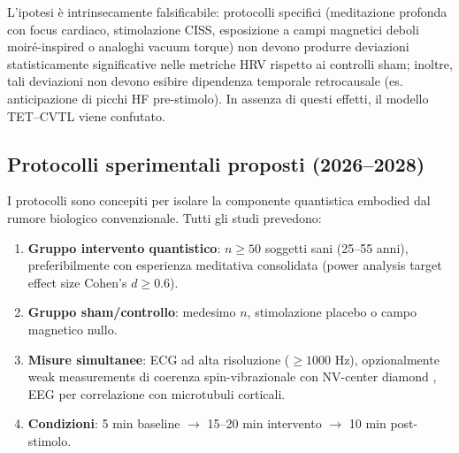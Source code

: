 \documentclass[11pt,a4paper]{article}
\let\oldcite\cite
\renewcommand{\cite}{\protect\oldcite}
\theoremstyle{plain}
\theoremstyle{definition}
\begin{document}
\vspace{0.3cm}

L'ipotesi è intrinsecamente falsificabile: protocolli specifici (meditazione profonda con focus cardiaco, stimolazione CISS, esposizione a campi magnetici deboli moiré-inspired o analoghi vacuum torque) non devono produrre deviazioni statisticamente significative nelle metriche HRV rispetto ai controlli sham; inoltre, tali deviazioni non devono esibire dipendenza temporale retrocausale (es. anticipazione di picchi HF pre-stimolo). In assenza di questi effetti, il modello TET--CVTL viene confutato.


\vspace{0.5cm}

\subsection{Protocolli sperimentali proposti (2026--2028)}

I protocolli sono concepiti per isolare la componente quantistica embodied dal rumore biologico convenzionale. Tutti gli studi prevedono:

\vspace{0.2cm}

\begin{enumerate}
    \item \textbf{Gruppo intervento quantistico}: $n \geq 50$ soggetti sani (25--55 anni), preferibilmente con esperienza meditativa consolidata (power analysis target effect size Cohen's $d \geq 0.6$).
    \item \textbf{Gruppo sham/controllo}: medesimo $n$, stimolazione placebo o campo magnetico nullo.
    \item \textbf{Misure simultanee}: ECG ad alta risoluzione ($\geq 1000$ Hz), opzionalmente weak measurements di coerenza spin-vibrazionale con NV-center diamond \cite{Niora2026, Eberle2026}, EEG per correlazione con microtubuli corticali.
    \item \textbf{Condizioni}: 5 min baseline $\to$ 15--20 min intervento $\to$ 10 min post-stimolo.
\end{enumerate}


\vspace{0.2cm}
\end{document}
